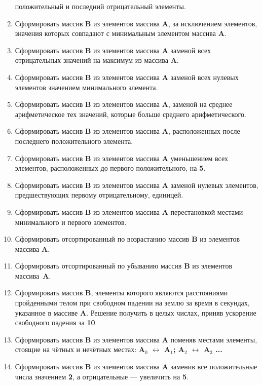 \begin{enumerate}
    положительный и последний отрицательный элементы.
    \item Сформировать массив \textbf{B} из элементов массива \textbf{A}, за исключением элементов, значения которых совпадают с минимальным элементом массива \textbf{A}.
    \item Сформировать массив \textbf{B} из элементов массива \textbf{A} заменой всех отрицательных значений на максимум из массива \textbf{A}.
    \item Сформировать массив \textbf{B} из элементов массива \textbf{A} заменой всех нулевых элементов значением минимального элемента.
    \item Сформировать массив \textbf{B} из элементов массива \textbf{A}, заменой на среднее арифметическое тех значений, которые больше среднего арифметического.
    \item Сформировать массив \textbf{B} из элементов массива \textbf{A}, расположенных после последнего положительного элемента.
    \item  Сформировать массив \textbf{B} из элементов массива \textbf{A} уменьшением всех элементов, расположенных до первого положительного, на \textbf{5}.
    \item Сформировать массив \textbf{B} из элементов массива \textbf{A} заменой нулевых элементов, предшествующих первому отрицательному, единицей.
    \item  Сформировать массив \textbf{B} из элементов массива \textbf{A} перестановкой местами минимального и первого элементов.
    \item Сформировать отсортированный по возрастанию массив \textbf{B} из элементов массива \textbf{A}.
    \item  Сформировать отсортированный по убыванию массив \textbf{B} из элементов массива~\textbf{A}.
    \item Сформировать массив \textbf{B}, элементы которого являются расстояниями пройденными телом при свободном падении на землю за время в секундах, указанное в массиве \textbf{A}. Решение получить в целых числах, приняв ускорение свободного падения за \textbf{10}.
    \item Сформировать массив \textbf{B} из элементов массива \textbf{A} поменяв местами элементы, стоящие на чётных и нечётных местах:
            \textbf{A$_0$ $\leftrightarrow$ A$_1$; A$_2$ $\leftrightarrow$ A$_3$ ...}
    \item Сформировать массив \textbf{B} из элементов массива \textbf{A} заменив все положительные числа значением \textbf{2}, а отрицательные — увеличить на \textbf{5}.

\end{enumerate}
